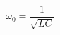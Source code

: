 \documentclass[preview]{standalone}
\begin{document}
\begin{align*}
\omega_0 = \dfrac{1}{\sqrt{LC}}
\end{align*}
\end{document}
